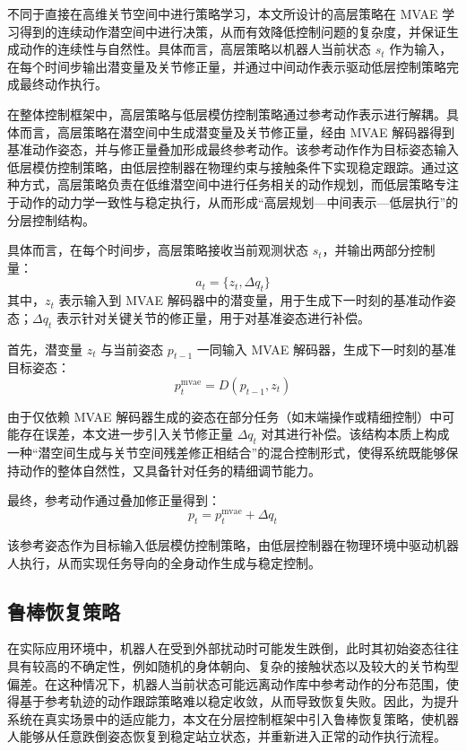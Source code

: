 不同于直接在高维关节空间中进行策略学习，本文所设计的高层策略在 MVAE 学习得到的连续动作潜空间中进行决策，从而有效降低控制问题的复杂度，并保证生成动作的连续性与自然性。具体而言，高层策略以机器人当前状态 $s_t$ 作为输入，在每个时间步输出潜变量及关节修正量，并通过中间动作表示驱动低层控制策略完成最终动作执行。

在整体控制框架中，高层策略与低层模仿控制策略通过参考动作表示进行解耦。具体而言，高层策略在潜空间中生成潜变量及关节修正量，经由 MVAE 解码器得到基准动作姿态，并与修正量叠加形成最终参考动作。该参考动作作为目标姿态输入低层模仿控制策略，由低层控制器在物理约束与接触条件下实现稳定跟踪。通过这种方式，高层策略负责在低维潜空间中进行任务相关的动作规划，而低层策略专注于动作的动力学一致性与稳定执行，从而形成“高层规划—中间表示—低层执行”的分层控制结构。

具体而言，在每个时间步，高层策略接收当前观测状态 $s_t$，并输出两部分控制量：
\begin{equation}
	a_t = \{z_t, \Delta q_t\}
\end{equation}
其中，$z_t$ 表示输入到 MVAE 解码器中的潜变量，用于生成下一时刻的基准动作姿态；$\Delta q_t$ 表示针对关键关节的修正量，用于对基准姿态进行补偿。

首先，潜变量 $z_t$ 与当前姿态 $p_{t-1}$ 一同输入 MVAE 解码器，生成下一时刻的基准目标姿态：
\begin{equation}
	p_t^{\mathrm{mvae}} = D(p_{t-1}, z_t)
\end{equation}

由于仅依赖 MVAE 解码器生成的姿态在部分任务（如末端操作或精细控制）中可能存在误差，本文进一步引入关节修正量 $\Delta q_t$ 对其进行补偿。该结构本质上构成一种“潜空间生成与关节空间残差修正相结合”的混合控制形式，使得系统既能够保持动作的整体自然性，又具备针对任务的精细调节能力。

最终，参考动作通过叠加修正量得到：
\begin{equation}
	p_t = p_t^{\mathrm{mvae}} + \Delta q_t
\end{equation}

该参考姿态作为目标输入低层模仿控制策略，由低层控制器在物理环境中驱动机器人执行，从而实现任务导向的全身动作生成与稳定控制。



\subsection{鲁棒恢复策略}
在实际应用环境中，机器人在受到外部扰动时可能发生跌倒，此时其初始姿态往往具有较高的不确定性，例如随机的身体朝向、复杂的接触状态以及较大的关节构型偏差。在这种情况下，机器人当前状态可能远离动作库中参考动作的分布范围，使得基于参考轨迹的动作跟踪策略难以稳定收敛，从而导致恢复失败。因此，为提升系统在真实场景中的适应能力，本文在分层控制框架中引入鲁棒恢复策略，使机器人能够从任意跌倒姿态恢复到稳定站立状态，并重新进入正常的动作执行流程。

